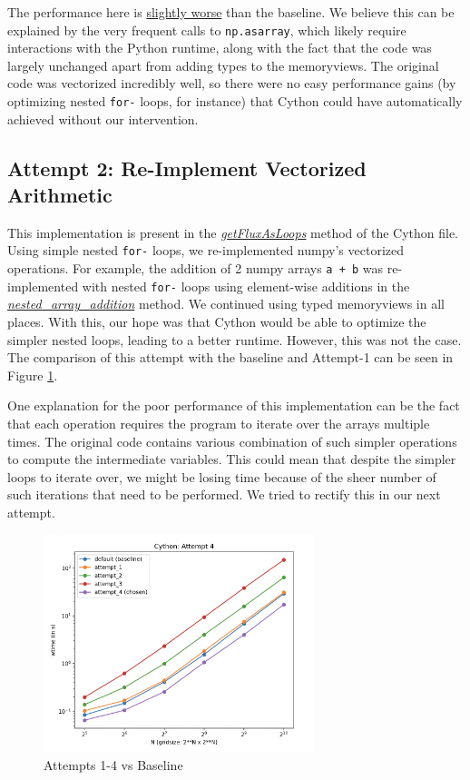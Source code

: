 \documentclass[a4paper,10pt]{article}
\begin{document}
The performance here is \underline{slightly worse} than the baseline. We believe this can be explained by the very frequent calls to \verb|np.asarray|, which likely require interactions with the Python runtime, along with the fact that the code was largely unchanged apart from adding types to the memoryviews. The original code was vectorized incredibly well, so there were no easy performance gains (by optimizing nested \verb|for-| loops, for instance) that Cython could have automatically achieved without our intervention.

\subsection{Attempt 2: Re-Implement Vectorized Arithmetic}
This implementation is present in the \href{https://github.com/paulmyr/DD2358-HPC25/blob/master/10_project_rishi_paul/code/cython/finitevolume_cython_lib.pyx#L155}{\textit{getFluxAsLoops}} method of the Cython file. Using simple nested \verb|for-| loops, we re-implemented numpy's vectorized operations. For example, the addition of 2 numpy arrays \verb|a + b| was re-implemented with nested \verb|for-| loops using element-wise additions in the \href{https://github.com/paulmyr/DD2358-HPC25/blob/master/10_project_rishi_paul/code/cython/finitevolume_cython_lib.pyx#L91}{\textit{nested\_array\_addition}} method. We continued using typed memoryviews in all places. With this, our hope was that Cython would be able to optimize the simpler nested loops, leading to a better runtime. However, this was not the case. The comparison of this attempt with the baseline and Attempt-1 can be seen in 
Figure \ref{fig:cython_attempts}. 

One explanation for the poor performance of this implementation can be the fact that each operation requires the program to iterate over the arrays multiple times. The original code contains various combination of such simpler operations to compute the intermediate variables. This could mean that despite the simpler loops to iterate over, we might be losing time because of the sheer number of such iterations that need to be performed. We tried to rectify this in our next attempt.

\begin{figure}[h]
  \centering
  \includegraphics[width=0.7\textwidth]{images/cython/cython_attempt_4.png}
  \caption{Attempts 1-4 vs Baseline}
  \label{fig:cython_attempts}
\end{figure}
\end{document}

